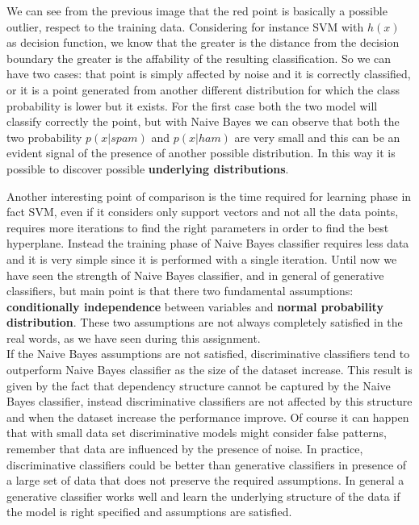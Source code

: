 \documentclass[11pt,a4paper]{article}
\begin{document}
We can see from the previous image that the red point is basically a possible outlier, respect to the training data. Considering for instance SVM with $h(x)$ as decision function, we know that the greater is the distance from the decision boundary the greater is the affability of the resulting classification. So we can have two cases: that point is simply affected by noise and it is correctly classified, or it is a point generated from another different distribution for which the class probability is lower but it exists. For the first case both the two model will classify correctly the point, but with Naive Bayes we can observe that both the two probability $p(x | spam)$ and $p(x | ham)$ are very small and this can be an evident signal of the presence of another possible distribution. In this way it is possible to discover possible \textbf{underlying distributions}.

Another interesting point of comparison is the time required for learning phase in fact SVM, even if it considers only support vectors and not all the data points, requires more iterations to find the right parameters in order to find the best hyperplane. Instead the training phase of Naive Bayes classifier requires less data and it is very simple since it is performed with a single iteration.
Until now we have seen the strength of Naive Bayes classifier, and in general of generative classifiers, but main point is that there two fundamental assumptions: \textbf{conditionally independence} between variables and \textbf{normal probability distribution}. These two assumptions are not always completely satisfied in the real words, as we have seen during this assignment.\\
If the Naive Bayes assumptions are not satisfied, discriminative classifiers tend to outperform Naive Bayes classifier as the size of the dataset increase. This result is given by the fact that dependency structure cannot be captured by the Naive Bayes classifier, instead discriminative classifiers are not affected by this structure and when the dataset increase the performance improve. Of course it can happen that with small data set discriminative models might consider false patterns, remember that data are influenced by the presence of noise. In practice, discriminative classifiers could be better than generative classifiers in presence of a large set of data that does not preserve the required assumptions. In general a generative classifier works well and learn the underlying structure of the data if the model is right specified and assumptions are satisfied.
\end{document}
